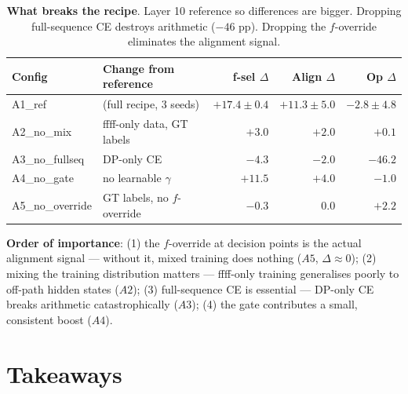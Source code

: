 \documentclass[10pt]{article}
\begin{document}
\begin{table}[ht]
  \centering\small
  \caption{\textbf{What breaks the recipe}. Layer 10 reference so
    differences are bigger. Dropping full-sequence CE destroys arithmetic
    ($-46$ pp). Dropping the $f$-override eliminates the alignment signal.}
  \label{tab:ingredients}
  \renewcommand{\arraystretch}{1.1}
  \begin{tabular}{llrrr}
    \toprule
    \textbf{Config} & \textbf{Change from reference} &
    \textbf{f-sel $\Delta$} & \textbf{Align $\Delta$} & \textbf{Op $\Delta$} \\
    \midrule
    A1\_ref & (full recipe, 3 seeds) & $+17.4 \pm 0.4$ & $+11.3 \pm 5.0$ & $-2.8 \pm 4.8$ \\
    A2\_no\_mix      & ffff-only data, GT labels   & $+3.0$ & $+2.0$ & $+0.1$ \\
    A3\_no\_fullseq  & DP-only CE                  & $-4.3$ & $-2.0$ & \textcolor{bad}{$-46.2$} \\
    A4\_no\_gate     & no learnable $\gamma$       & $+11.5$ & $+4.0$ & $-1.0$ \\
    A5\_no\_override & GT labels, no $f$-override  & $-0.3$ & $0.0$ & $+2.2$ \\
    \bottomrule
  \end{tabular}
\end{table}

\textbf{Order of importance}: (1) the $f$-override at decision points is
the actual alignment signal --- without it, mixed training does nothing
($A5$, $\Delta \approx 0$); (2) mixing the training distribution matters
--- ffff-only training generalises poorly to off-path hidden states
($A2$); (3) full-sequence CE is essential --- DP-only CE breaks
arithmetic catastrophically ($A3$); (4) the gate contributes a small,
consistent boost ($A4$).

\section{Takeaways}
\end{document}
